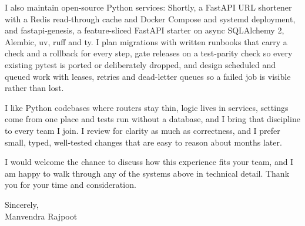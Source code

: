 \documentclass[11pt,a4paper]{article}
\begin{document}
I also maintain open-source Python services: Shortly, a FastAPI URL shortener with a
Redis read-through cache and Docker Compose and systemd deployment, and fastapi-genesis,
a feature-sliced FastAPI starter on async SQLAlchemy 2, Alembic, uv, ruff and ty. I plan
migrations with written runbooks that carry a check and a rollback for every step, gate
releases on a test-parity check so every existing pytest is ported or deliberately
dropped, and design scheduled and queued work with leases, retries and dead-letter
queues so a failed job is visible rather than lost.

I like Python codebases where routers stay thin, logic lives in services, settings
come from one place and tests run without a database, and I bring that discipline to every
team I join. I review for clarity as much as correctness, and I prefer small, typed,
well-tested changes that are easy to reason about months later.

I would welcome the chance to discuss how this experience fits your team, and I am
happy to walk through any of the systems above in technical detail. Thank you for your
time and consideration.


Sincerely,\\[6pt]
Manvendra Rajpoot
\end{document}
